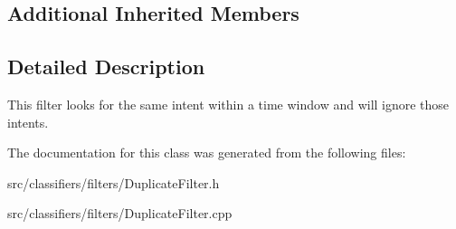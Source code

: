 \subsection*{Additional Inherited Members}


\subsection{Detailed Description}
This filter looks for the same intent within a time window and will ignore those intents. 

The documentation for this class was generated from the following files\+:\begin{DoxyCompactItemize}
\item 
src/classifiers/filters/Duplicate\+Filter.\+h\item 
src/classifiers/filters/Duplicate\+Filter.\+cpp\end{DoxyCompactItemize}
